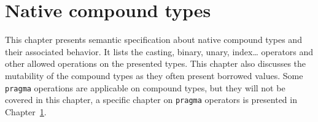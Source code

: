 \documentclass[a4paper,11pt]{book}
\begin{document}
\begin{multicols}{2}
  \minitoc%
  
\end{multicols}

\chapter{Native compound types}

This chapter presents semantic specification about native compound types and
their associated behavior. It lists the casting, binary, unary, index\ldots
operators and other allowed operations on the presented types. This chapter also
discusses the mutability of the compound types as they often present borrowed
values. Some \texttt{pragma} operations are applicable on compound types, but
they will not be covered in this chapter, a specific chapter on \texttt{pragma}
operators is presented in Chapter~\ref{}.

\begin{multicols}{2}
  \minitoc%
  
\end{multicols}
\end{document}
